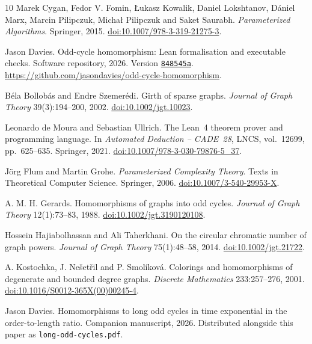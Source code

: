 \documentclass[11pt]{article}
\theoremstyle{remark}
\begin{document}
\begin{thebibliography}{10}
Marek Cygan, Fedor V. Fomin, {\L}ukasz Kowalik, Daniel Lokshtanov,
D\'aniel Marx, Marcin Pilipczuk, Micha{\l} Pilipczuk and Saket Saurabh.
\emph{Parameterized Algorithms}. Springer, 2015.
\href{https://doi.org/10.1007/978-3-319-21275-3}{doi:10.1007/978-3-319-21275-3}.

Jason Davies.
Odd-cycle homomorphism: Lean formalisation and executable checks.
Software repository, 2026. Version
\href{https://github.com/jasondavies/odd-cycle-homomorphism/tree/848545ac03da8691fdd511e29b3e247e446fb523}{\texttt{848545a}}.
\url{https://github.com/jasondavies/odd-cycle-homomorphism}.

B\'ela Bollob\'as and Endre Szemer\'edi.
Girth of sparse graphs.
\emph{Journal of Graph Theory} 39(3):194--200, 2002.
\href{https://doi.org/10.1002/jgt.10023}{doi:10.1002/jgt.10023}.

Leonardo de Moura and Sebastian Ullrich.
The Lean~4 theorem prover and programming language.
In \emph{Automated Deduction -- CADE~28}, LNCS, vol.~12699,
pp.~625--635. Springer, 2021.
\href{https://doi.org/10.1007/978-3-030-79876-5_37}{doi:10.1007/978-3-030-79876-5\_37}.



J\"org Flum and Martin Grohe.
\emph{Parameterized Complexity Theory}.
Texts in Theoretical Computer Science. Springer, 2006.
\href{https://doi.org/10.1007/3-540-29953-X}{doi:10.1007/3-540-29953-X}.

A. M. H. Gerards.
Homomorphisms of graphs into odd cycles.
\emph{Journal of Graph Theory} 12(1):73--83, 1988.
\href{https://doi.org/10.1002/jgt.3190120108}{doi:10.1002/jgt.3190120108}.

Hossein Hajiabolhassan and Ali Taherkhani.
On the circular chromatic number of graph powers.
\emph{Journal of Graph Theory} 75(1):48--58, 2014.
\href{https://doi.org/10.1002/jgt.21722}{doi:10.1002/jgt.21722}.

A. Kostochka, J. Ne\v{s}et\v{r}il and P. Smol\'ikov\'a.
Colorings and homomorphisms of degenerate and bounded degree graphs.
\emph{Discrete Mathematics} 233:257--276, 2001.
\href{https://doi.org/10.1016/S0012-365X(00)00245-4}{doi:10.1016/S0012-365X(00)00245-4}.

Jason Davies. Homomorphisms to long odd cycles in time exponential in the
order-to-length ratio. Companion manuscript, 2026.
Distributed alongside this paper as \texttt{long-odd-cycles.pdf}.


\end{thebibliography}
\end{document}
